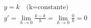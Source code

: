 \begin{ex}
\begin{align}
&y=k\quad\text{(k=constante)}\nonumber\\
&y'=\lim_{h\rightarrow 0} \frac{k-k}{h} =\lim_{h\rightarrow 0} \frac{0}{h}=0\nonumber
\end{align}
\end{ex}